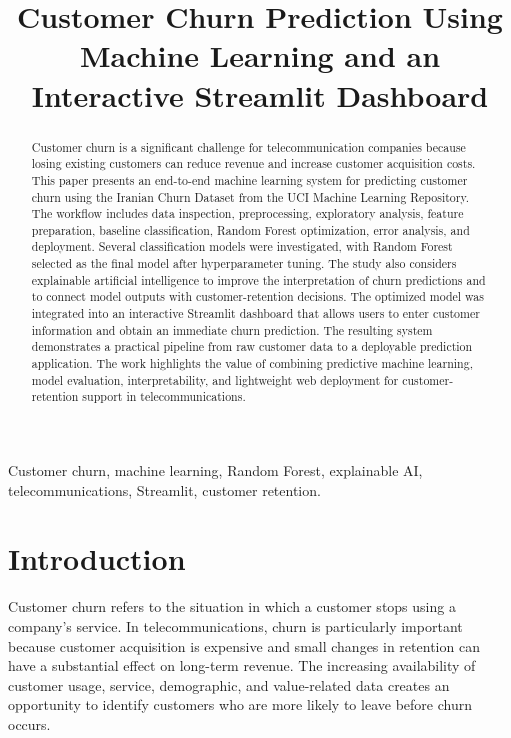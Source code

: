 \documentclass[conference]{IEEEtran}
\title{Customer Churn Prediction Using Machine Learning and an Interactive Streamlit Dashboard}
\author{\IEEEauthorblockN{Zunaira Tahir}
\IEEEauthorblockA{BSc Artificial Intelligence\\
AI \& Machine Learning Internship\\
IT Simplera Solutions}}
\begin{document}
\maketitle

\begin{abstract}
Customer churn is a significant challenge for telecommunication companies because losing existing customers can reduce revenue and increase customer acquisition costs. This paper presents an end-to-end machine learning system for predicting customer churn using the Iranian Churn Dataset from the UCI Machine Learning Repository. The workflow includes data inspection, preprocessing, exploratory analysis, feature preparation, baseline classification, Random Forest optimization, error analysis, and deployment. Several classification models were investigated, with Random Forest selected as the final model after hyperparameter tuning. The study also considers explainable artificial intelligence to improve the interpretation of churn predictions and to connect model outputs with customer-retention decisions. The optimized model was integrated into an interactive Streamlit dashboard that allows users to enter customer information and obtain an immediate churn prediction. The resulting system demonstrates a practical pipeline from raw customer data to a deployable prediction application. The work highlights the value of combining predictive machine learning, model evaluation, interpretability, and lightweight web deployment for customer-retention support in telecommunications.
\end{abstract}

\begin{IEEEkeywords}
Customer churn, machine learning, Random Forest, explainable AI, telecommunications, Streamlit, customer retention.
\end{IEEEkeywords}

\section{Introduction}
Customer churn refers to the situation in which a customer stops using a company's service. In telecommunications, churn is particularly important because customer acquisition is expensive and small changes in retention can have a substantial effect on long-term revenue. The increasing availability of customer usage, service, demographic, and value-related data creates an opportunity to identify customers who are more likely to leave before churn occurs.
\end{document}
